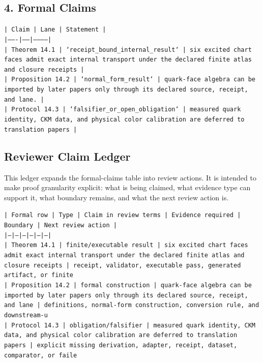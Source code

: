\documentclass[11pt]{article}
\begin{document}
\subsection*{4. Formal Claims}

\noindent\texttt{| Claim | Lane | Statement |}\\
\noindent\texttt{|-------|------|-----------|}\\
\noindent\texttt{| Theorem 14.1 | `receipt\_bound\_internal\_result` | six excited chart faces admit exact internal transport under the declared finite atlas and closure receipts |}\\
\noindent\texttt{| Proposition 14.2 | `normal\_form\_result` | quark-face algebra can be imported by later papers only through its declared source, receipt, and lane. |}\\
\noindent\texttt{| Protocol 14.3 | `falsifier\_or\_open\_obligation` | measured quark identity, CKM data, and physical color calibration are deferred to translation papers |}\\

\subsection*{Reviewer Claim Ledger}

This ledger expands the formal-claims table into review actions. It is intended to make proof granularity explicit: what is being claimed, what evidence type can support it, what boundary remains, and what the next review action is.

\noindent\texttt{| Formal row | Type | Claim in review terms | Evidence required | Boundary | Next review action |}\\
\noindent\texttt{|---|---|---|---|---|---|}\\
\noindent\texttt{| Theorem 14.1 | finite/executable result | six excited chart faces admit exact internal transport under the declared finite atlas and closure receipts | receipt, validator, executable pass, generated artifact, or finite}\\
\noindent\texttt{| Proposition 14.2 | formal construction | quark-face algebra can be imported by later papers only through its declared source, receipt, and lane | definitions, normal-form construction, conversion rule, and downstream-u}\\
\noindent\texttt{| Protocol 14.3 | obligation/falsifier | measured quark identity, CKM data, and physical color calibration are deferred to translation papers | explicit missing derivation, adapter, receipt, dataset, comparator, or faile}\\
\end{document}
